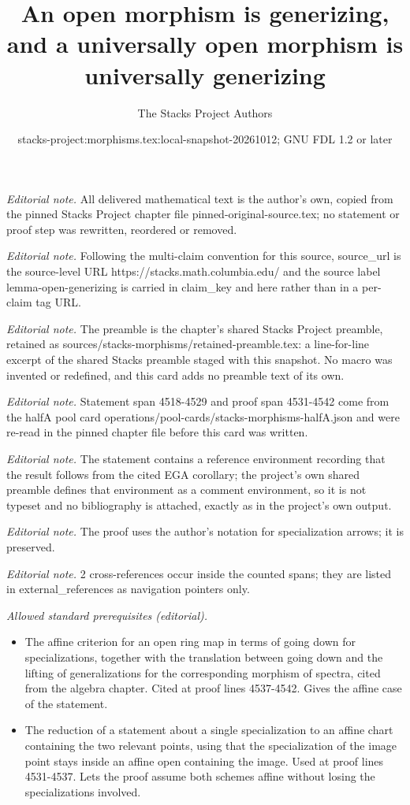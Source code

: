 \documentclass[10pt,a4paper]{amsart}
\title{An open morphism is generizing, and a universally open morphism is universally generizing}
\author{The Stacks Project Authors}
\date{stacks-project:morphisms.tex:local-snapshot-20261012; GNU FDL 1.2 or later}
\theoremstyle{plain}
\theoremstyle{definition}
\theoremstyle{remark}
\numberwithin{equation}{subsection}
\begin{document}
\maketitle
\noindent\textit{Editorial note.} All delivered mathematical text is the author's own, copied from the pinned Stacks Project chapter file pinned-original-source.tex; no statement or proof step was rewritten, reordered or removed.\par\medskip
\noindent\textit{Editorial note.} Following the multi-claim convention for this source, source\_url is the source-level URL https://stacks.math.columbia.edu/ and the source label lemma-open-generizing is carried in claim\_key and here rather than in a per-claim tag URL.\par\medskip
\noindent\textit{Editorial note.} The preamble is the chapter's shared Stacks Project preamble, retained as sources/stacks-morphisms/retained-preamble.tex: a line-for-line excerpt of the shared Stacks preamble staged with this snapshot. No macro was invented or redefined, and this card adds no preamble text of its own.\par\medskip
\noindent\textit{Editorial note.} Statement span 4518-4529 and proof span 4531-4542 come from the halfA pool card operations/pool-cards/stacks-morphisms-halfA.json and were re-read in the pinned chapter file before this card was written.\par\medskip
\noindent\textit{Editorial note.} The statement contains a reference environment recording that the result follows from the cited EGA corollary; the project's own shared preamble defines that environment as a comment environment, so it is not typeset and no bibliography is attached, exactly as in the project's own output.\par\medskip
\noindent\textit{Editorial note.} The proof uses the author's notation for specialization arrows; it is preserved.\par\medskip
\noindent\textit{Editorial note.} 2 cross-references occur inside the counted spans; they are listed in external\_references as navigation pointers only.\par\medskip
\noindent\textit{Allowed standard prerequisites (editorial).}\begin{itemize}
\item The affine criterion for an open ring map in terms of going down for specializations, together with the translation between going down and the lifting of generalizations for the corresponding morphism of spectra, cited from the algebra chapter. Cited at proof lines 4537-4542. Gives the affine case of the statement.
\item The reduction of a statement about a single specialization to an affine chart containing the two relevant points, using that the specialization of the image point stays inside an affine open containing the image. Used at proof lines 4531-4537. Lets the proof assume both schemes affine without losing the specializations involved.
\end{itemize}\medskip
\end{document}
